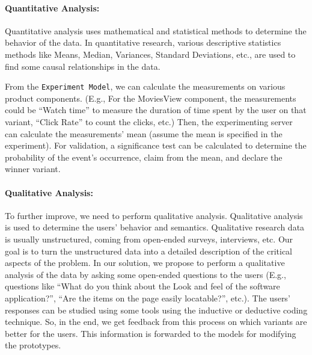 \paragraph{Quantitative Analysis:}
\label{solutionideas:paragraph:quantitative}
Quantitative analysis uses mathematical and statistical methods to determine the behavior of the data.
In quantitative research, various descriptive statistics methods like Means, Median, Variances, Standard Deviations, etc., are used to find some causal relationships in the data.

From the \texttt{Experiment Model}, we can calculate the measurements on various product components. 
(E.g., For the MoviesView component, the measurements could be ``Watch time'' to measure the duration of time spent by the user on that variant, ``Click Rate'' to count the clicks, etc.) 
Then, the experimenting server can calculate the measurements' mean (assume the mean is specified in the experiment). 
For validation, a significance test can be calculated to determine the probability of the event's occurrence, claim from the mean, and declare the winner variant.

\paragraph{Qualitative Analysis:}
\label{solutionideas:paragraph:qualitative}
To further improve, we need to perform qualitative analysis.
Qualitative analysis is used to determine the users' behavior and semantics.
Qualitative research data is usually unstructured, coming from open-ended surveys, interviews, etc. 
Our goal is to turn the unstructured data into a detailed description of the critical aspects of the problem.
In our solution, we propose to perform a qualitative analysis of the data by asking some open-ended questions to the users
(E.g., questions like ``What do you think about the Look and feel of the software application?'', ``Are the items on the page easily locatable?'', etc.).
The users' responses can be studied using some tools using the inductive or deductive coding technique. 
So, in the end, we get feedback from this process on which variants are better for the users. 
This information is forwarded to the models for modifying the prototypes.

